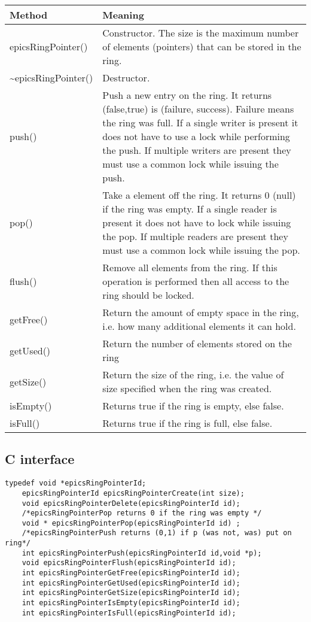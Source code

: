 \begin{center}
\begin{longtable}{p{1.27778in}p{5.0in}}
\textbf{Method} & \textbf{Meaning}\\
\hline
epicsRingPointer() & Constructor. The size is the maximum number of elements (pointers) that can be stored in the ring.\\
\~{}epicsRingPointer() & Destructor.\\
push() & Push a new entry on the ring. It returns (false,true) is (failure, success). Failure means the ring was full. If a single writer is present it does not have to use a lock while performing the push. If multiple writers are present they must use a common lock while issuing the push. \\
pop() & Take a element off the ring. It returns 0 (null) if the ring was empty. If a single reader is present it does not have to lock while issuing the pop. If multiple readers are present they must use a common lock while issuing the pop.\\
flush() & Remove all elements from the ring. If this operation is performed then all access to the ring should be locked.\\
getFree() & Return the amount of empty space in the ring, i.e. how many additional elements it can hold.\\
getUsed() & Return the number of elements stored on the ring\\
getSize() & Return the size of the ring, i.e. the value of size specified when the ring was created.\\
isEmpty() & Returns true if the ring is empty, else false.\\
isFull() & Returns true if the ring is full, else false.
\end{longtable}

\end{center}


\subsection{C interface}

\begin{verbatim}
typedef void *epicsRingPointerId;
    epicsRingPointerId epicsRingPointerCreate(int size);
    void epicsRingPointerDelete(epicsRingPointerId id);
    /*epicsRingPointerPop returns 0 if the ring was empty */
    void * epicsRingPointerPop(epicsRingPointerId id) ;
    /*epicsRingPointerPush returns (0,1) if p (was not, was) put on ring*/
    int epicsRingPointerPush(epicsRingPointerId id,void *p);
    void epicsRingPointerFlush(epicsRingPointerId id);
    int epicsRingPointerGetFree(epicsRingPointerId id);
    int epicsRingPointerGetUsed(epicsRingPointerId id);
    int epicsRingPointerGetSize(epicsRingPointerId id);
    int epicsRingPointerIsEmpty(epicsRingPointerId id);
    int epicsRingPointerIsFull(epicsRingPointerId id);
\end{verbatim}


